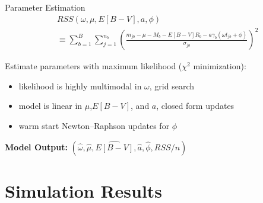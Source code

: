 \documentclass[12pt]{beamer}
\begin{document}
\begin{frame}{Parameter Estimation}
\begin{align*}
&RSS(\omega,\mu,E[B-V],a,\phi) \\
 &\equiv\sum_{b=1}^B \sum_{j=1}^{n_b}\left(\frac{m_{jb} - \mu - M_b - E[B-V]R_b - a\gamma_b(\omega t_{jb} + \phi)}{\sigma_{jb}}\right)^2
\end{align*}


Estimate parameters with maximum likelihood ($\chi^2$ minimization):
\begin{itemize}
\item likelihood is highly multimodal in $\omega$, grid search
\item model is linear in $\mu$,$E[B-V]$, and $a$, closed form updates
\item warm start Newton--Raphson updates for $\phi$
\end{itemize}

\vspace{.2in}

\begin{center}
  \textbf{Model Output:} $(\widehat{\omega},\widehat{\mu},\widehat{E[B-V]},\widehat{a},\widehat{\phi},RSS/n)$
\end{center}

\end{frame}

\section{Simulation Results}
\end{document}
